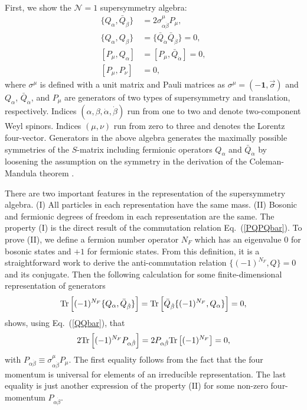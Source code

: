 \documentclass[12pt,twoside,book]{article}
\begin{document}
First, we show the $\mathcal{N} = 1$ supersymmetry algebra: \cite{Haag:1974qh}
\begin{align}
  \{ Q_\alpha, \bar{Q}_{\dot{\beta}} \} &= 2 \sigma_{\alpha
  \dot{\beta}}^\mu P_\mu,\label{QQbar} \\
  \{ Q_\alpha, Q_\beta \} &= \{ \bar{Q}_{\dot{\alpha}}
  \bar{Q}_{\dot{\beta}} \}  = 0,\label{QQQbarQbar} \\
  [ P_\mu, Q_\alpha ] &= [ P_\mu, \bar{Q}_{\dot{\alpha}} ] =
  0,\label{PQPQbar}\\
  [ P_\mu, P_\nu ] &= 0,\label{PP}
\end{align}
where $\sigma^\mu$ is defined with a unit matrix and Pauli matrices as $\sigma^\mu = (-\textbf{1},\vec{\sigma})$ and $Q_\alpha$, $\bar{Q}_{\dot{\alpha}}$, and $P_\mu$ are generators of two types of supersymmetry and translation, respectively.
Indices $(\alpha,\beta,\dot{\alpha},\dot{\beta})$ run from one to two and denote two-component Weyl spinors.
Indices $(\mu,\nu)$ run from zero to three and denotes the Lorentz four-vector.
Generators in the above algebra generates the maximally possible symmetries of the $S$-matrix including fermionic operators $Q_\alpha$ and $\bar{Q}_{\dot{\alpha}}$ by loosening the assumption on the symmetry in the derivation of the Coleman-Mandula theorem \cite{Coleman:1967ad}.

There are two important features in the representation of the supersymmetry algebra.
(I) All particles in each representation have the same mass.
(II) Bosonic and fermionic degrees of freedom in each representation are the same.
The property (I) is the direct result of the commutation relation Eq.\ (\ref{PQPQbar}).
To prove (II), we define a fermion number operator $N_F$ which has an eigenvalue $0$ for bosonic states and $+1$ for fermionic states.
From this definition, it is a straightforward work to derive the anti-commutation relation $\{(-1)^{N_F},Q\}=0$ and its conjugate.
Then the following calculation for some finite-dimensional representation of generators
\begin{align}
 {\rm Tr} \left[ (-1)^{N_F} \{Q_\alpha, \bar{Q}_{\dot{\beta}}\} \right]
 = {\rm Tr} \left[ \bar{Q}_{\dot{\beta}} \{ (-1)^{N_F}, Q_\alpha \} \right] = 0,
\end{align}
shows, using Eq.\ (\ref{QQbar}), that
\begin{align}
 2{\rm Tr} \left[ (-1)^{N_F} P_{\alpha \dot{\beta}} \right]
 = 2P_{\alpha \dot{\beta}} {\rm Tr} \left[(-1)^{N_F} \right] = 0,
\end{align}
with $P_{\alpha \dot{\beta}} \equiv \sigma^\mu_{\alpha \dot{\beta}} P_\mu$.
The first equality follows from the fact that the four momentum is universal for elements of an irreducible representation.
The last equality is just another expression of the property (II) for some non-zero four-momentum $P_{\alpha \dot{\beta}}$.
\end{document}
